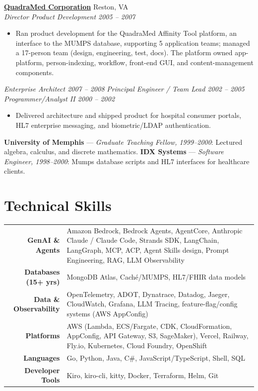 \documentclass[10pt,letterpaper]{article}
\begin{document}
\textbf{\href{http://www.quadramed.com/}{QuadraMed Corporation}} \hfill {\small\color{lighttext} Reston, VA}\\
{\small\itshape\color{accent} Director Product Development \hfill 2005 -- 2007}
\begin{itemize}
\item {\small Ran product development for the QuadraMed Affinity Tool platform, an interface to the MUMPS database, supporting 5 application teams; managed a 17-person team (design, engineering, test, docs). The platform owned app-platform, person-indexing, workflow, front-end GUI, and content-management components.}
\end{itemize}

{\small\itshape\color{accent} Enterprise Architect \hfill 2007 -- 2008}
{\small\enspace\textbar\enspace}
{\small\itshape\color{accent} Principal Engineer / Team Lead \hfill 2002 -- 2005}
{\small\enspace\textbar\enspace}
{\small\itshape\color{accent} Programmer/Analyst II \hfill 2000 -- 2002}
\begin{itemize}
\item {\small Delivered architecture and shipped product for hospital consumer portals, HL7 enterprise messaging, and biometric/LDAP authentication.}
\end{itemize}

{\small\textbf{University of Memphis} --- \textit{\color{accent}Graduate Teaching Fellow, 1999--2000}: Lectured algebra, calculus, and discrete mathematics. \enspace\textbar\enspace \textbf{IDX Systems} --- \textit{\color{accent}Software Engineer, 1998--2000}: Mumps database scripts and HL7 interfaces for healthcare clients.}

\section{Technical Skills}
\begin{tabularx}{\textwidth}{@{}r X@{}}
{\small\bfseries\color{accent} GenAI \& Agents} & {\small Amazon Bedrock, Bedrock Agents, AgentCore, Anthropic Claude / Claude Code, Strands SDK, LangChain, LangGraph, MCP, ACP, Agent Skills design, Prompt Engineering, RAG, LLM Observability} \\
{\small\bfseries\color{accent} Databases (15+ yrs)} & {\small MongoDB Atlas, Cach\'e/MUMPS, HL7/FHIR data models} \\
{\small\bfseries\color{accent} Data \& Observability} & {\small OpenTelemetry, ADOT, Dynatrace, Datadog, Jaeger, CloudWatch, Grafana, LLM Tracing, feature-flag/config systems (AWS AppConfig)} \\
{\small\bfseries\color{accent} Platforms} & {\small AWS (Lambda, ECS/Fargate, CDK, CloudFormation, AppConfig, API Gateway, S3, SageMaker), Vercel, Railway, Fly.io, Kubernetes, Cloud Foundry, OpenShift} \\
{\small\bfseries\color{accent} Languages} & {\small Go, Python, Java, C\#, JavaScript/TypeScript, Shell, SQL} \\
{\small\bfseries\color{accent} Developer Tools} & {\small Kiro, kiro-cli, kitty, Docker, Terraform, Helm, Git} \\
\end{tabularx}
\end{document}
